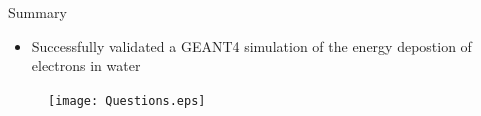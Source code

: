 \documentclass[compress]{beamer}
\begin{document}
\begin{frame}{Summary}
  \begin{itemize}
    \item Successfully validated a GEANT4 simulation of the energy depostion of electrons in water
  \end{itemize}
\end{frame}
\begin{frame}
	\centering
  \begin{figure}
    \texttt{[image: Questions.eps]}
  \end{figure}
\end{frame}
%  
\end{document}
